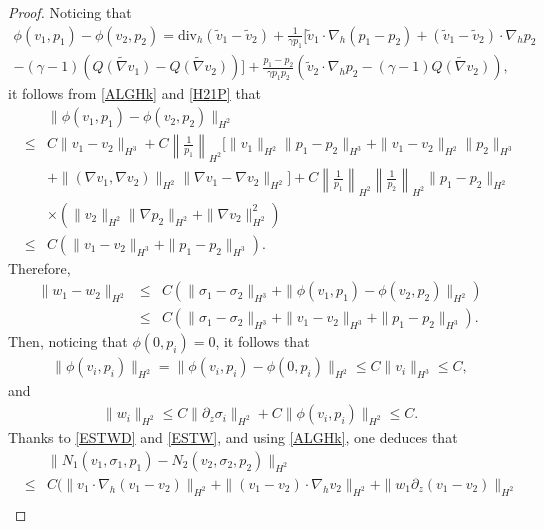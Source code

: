 \documentclass[12pt,reqno]{amsart}
\numberwithin{equation}{section}
\begin{document}
\begin{proof}
Noticing that
\begin{eqnarray*}
  \phi(v_1,p_1)-\phi(v_2,p_2)
   = \text{div}_h(\tilde v_1-\tilde v_2)+\frac{1}{\gamma p_1}\Big[\tilde v_1\cdot\nabla_h(p_1-p_2)+(\tilde v_1-\tilde v_2)\cdot\nabla_hp_2\\
  -(\gamma-1)\left(\widetilde{Q(\nabla v_1)}-\widetilde{Q(\nabla v_2)}\right)\Big]+\frac{p_1-p_2}{\gamma  p_1p_2}\left(\tilde v_2\cdot\nabla_hp_2-(\gamma-1)\widetilde{Q(\nabla v_2)}\right),
  \end{eqnarray*}
it follows from \eqref{ALGHk} and \eqref{H21P} that
\begin{eqnarray}
  &&\|\phi(v_1,p_1)-\phi(v_2,p_2)\|_{H^2}\nonumber\\
  &\leq&C\|v_1-v_2\|_{H^3}+C\left\|\frac{1}{p_1}\right\|_{H^2}[\|v_1\|_{H^2}\|p_1-p_2\|_{H^3}+\|v_1-v_2\|_{H^2}\|p_2\|_{H^3}\nonumber\\
  &&+\|(\nabla v_1,\nabla v_2)\|_{H^2}\|\nabla v_1-\nabla v_2\|_{H^2}]+C\left\|\frac{1}{p_1}\right\|_{H^2}\left\|\frac{1}{p_2}\right\|_{H^2}\|p_1-p_2\|_{H^2}\nonumber\\
  &&\times(\|v_2\|_{H^2}\|\nabla p_2\|_{H^2}+\|\nabla v_2\|_{H^2}^2)\nonumber\\
  &\leq&C(\|v_1-v_2\|_{H^3}+\|p_1-p_2\|_{H^3}).\label{ESTPHID}
\end{eqnarray}
Therefore,
\begin{eqnarray}
  \|w_1-w_2\|_{H^2}&\leq&C(\|\sigma_1-\sigma_2\|_{H^3}+\|\phi(v_1,p_1)-\phi(v_2,p_2)\|_{H^2})\nonumber\\
  &\leq&C(\|\sigma_1-\sigma_2\|_{H^3}+\|v_1-v_2\|_{H^3}+\|p_1-p_2\|_{H^3}).\label{ESTWD}
\end{eqnarray}
Then, noticing that $\phi(0,p_i)=0$, it follows that
\begin{eqnarray}
  \|\phi(v_i,p_i)\|_{H^2}=\|\phi(v_i,p_i)-\phi(0,p_i)\|_{H^2}\leq C\|v_i\|_{H^3}\leq C, \label{ESTPHI}
\end{eqnarray}
and
\begin{eqnarray}
  \|w_i\|_{H^2}\leq C\|\partial_z\sigma_i\|_{H^2}+C\|\phi(v_i,p_i)\|_{H^2}\leq C. \label{ESTW}
\end{eqnarray}
Thanks to \eqref{ESTWD} and \eqref{ESTW}, and using \eqref{ALGHk}, one deduces that
\begin{eqnarray*}
  &&\|N_1(v_1,\sigma_1,p_1)-N_2(v_2,\sigma_2,p_2)\|_{H^2}\nonumber\\
  &\leq&C(\|v_1\cdot\nabla_h(v_1-v_2)\|_{H^2}+\|(v_1-v_2)\cdot\nabla_hv_2\|_{H^2}+\|w_1\partial_z(v_1-v_2)\|_{H^2}\nonumber\\

\end{eqnarray*}
\end{proof}
\end{document}
